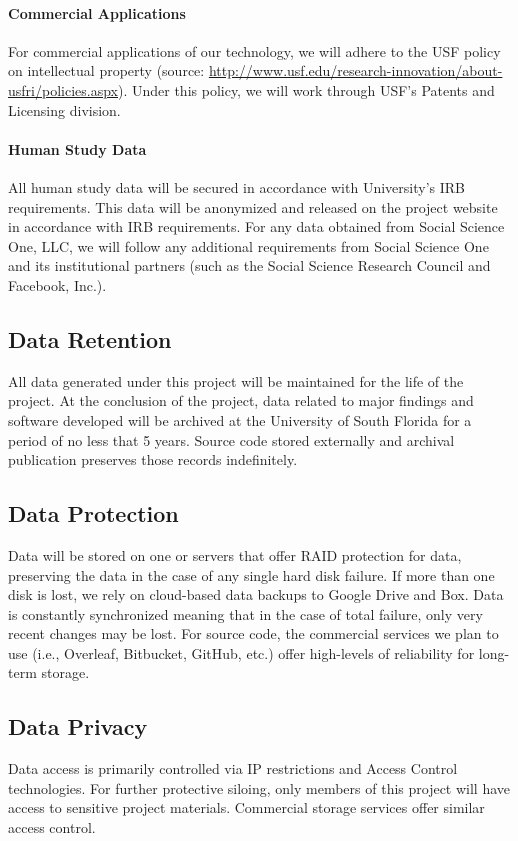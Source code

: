 \paragraph{Commercial Applications} For commercial applications of our technology, we will adhere to the USF policy on intellectual property (source: \url{http://www.usf.edu/research-innovation/about-usfri/policies.aspx}). Under this policy, we will work through USF's Patents and Licensing division.

\paragraph{Human Study Data} 

All human study data will be secured in accordance with University's IRB requirements. This data will be anonymized and released on the project website in accordance with IRB requirements. For any data obtained from Social Science One, LLC, we will follow any additional requirements from Social Science One and its institutional partners (such as the Social Science Research Council and Facebook, Inc.).

\subsection*{Data Retention}

All data generated under this project will be maintained for the life of the project. At the conclusion of the project, data related to major findings and software developed will be archived at the University of South Florida for a period of no less that 5 years. Source code stored externally and archival publication preserves those records indefinitely.

\subsection*{Data Protection}

Data will be stored on one or servers that offer RAID protection for data, preserving the data in the case of any single hard disk failure. If more than one disk is lost, we rely on cloud-based data backups to Google Drive and Box. Data is constantly synchronized meaning that in the case of total failure, only very recent changes may be lost. For source code, the commercial services we plan to use (i.e., Overleaf, Bitbucket, GitHub, etc.) offer high-levels of reliability for long-term storage. 

\subsection*{Data Privacy}

Data access is primarily controlled via IP restrictions and Access Control technologies. For further protective siloing, only members of this project will have access to sensitive project materials. Commercial storage services offer similar access control.
